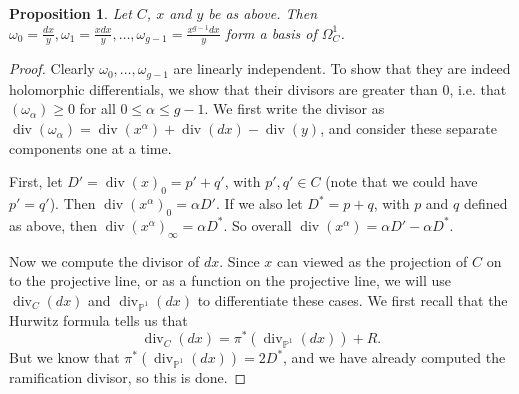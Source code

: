 \documentclass[11pt]{article} %
\newtheorem{prop}{Proposition}
\theoremstyle{remark}
\DeclareMathOperator{\di}{div}
\begin{document}
\begin{prop}
Let $C$, $x$ and $y$ be as above. Then $\omega_0 = \frac{dx}{y}, \omega_1 = \frac{xdx}{y}, \ldots , \omega_{g-1} = \frac{x^{g-1}dx}{y}$ form a basis of $\Omega_C^1$.
\end{prop}
\begin{proof}
Clearly $\omega_0, \ldots , \omega_{g-1}$ are linearly independent.
To show that they are indeed holomorphic differentials, we show that their divisors are greater than $0$, i.e. that $(\omega_{\alpha}) \geq 0$ for all $0\leq \alpha \leq g-1$.
We first write the divisor as $\di (\omega_{\alpha}) = \di (x^\alpha) + \di (dx) - \di (y)$, and consider these separate components one at a time.

First, let $D' = \di (x)_0 = p'+q'$, with $p',q' \in C$ (note that we could have $p' = q'$). 
Then $\di (x^\alpha)_0  = \alpha D'$. 
If we also let $D^* = p + q$, with $p$ and $q$ defined as above, then $\di (x^\alpha)_{\infty} = \alpha D^*$.
So overall $\di (x^\alpha) = \alpha D' - \alpha D^*$.


Now we compute the divisor of $dx$.
Since $x$ can viewed as the projection of $C$ on to the projective line, or as a function on the projective line, we will use $\di_C (dx)$ and $\di_{\mathbb P^1} (dx)$ to differentiate these cases.
We first recall that the Hurwitz formula tells us that
\[
 \di_C (dx) = \pi^*( \di_{\mathbb P^1}(dx)) + R.
\]
But we know that $\pi^* (\di_{\mathbb P^1}(dx)) = 2D^*$, and we have already computed the ramification divisor, so this is done.

\begin{comment} We now look at the divisor $(dx)$. 
Let $z_i$ be a local coordinate map for $p_i$, with $z_i(p_i) = 0$.
Since the ramification index of $x$ at $a_i$ is $2$, then $x - a_i = z_i^2h_i(z_i)$, where $h_i$ is a holomorphic map which does not vanish in a neighbourhood of $0$.
It follows that 
\[
 dx = \left(2z_ih_i(z_i) + z_i^2h_i'(z_i)\right) dz_i = z_i(2h_i(z_i) + z_ih_i'(z_i))dz_i.
\]

Evaluating at $p_i$ we see that $(2h_i(z_i) + z_ih_i'(z_i))|_{p_i} = 2h_i(0) \neq 0$, so $dx$ has a zero of order $1$ at each ramification point.

Now if we take one of the preimages of infinity, say $p$, then let $z$ be a co-ordinate near $p$ such that $z(p)=0$.
As $x$ has a pole of order $1$ at $p$ we have $u:=\frac{1}{x} = zh(z)$ for some holomorphic function $h$ such that $h(0)\neq 0$.
So
\[
dx = -\frac{du}{u^2} = -\frac{(h(z) + zh'(z))}{z^2h(z)^2},
\]
and as both $(h(z) + zh(z))|_p \neq 0$ and $h(z)^2|_p \neq 0$, $p$ is an order $2$ pole of $dx$.
We can run the exact same argument if we had chosen $q$ instead of $p$, so $q$ is also an order $2$ pole of $dx$.


\end{comment}
\end{proof}
\end{document}
